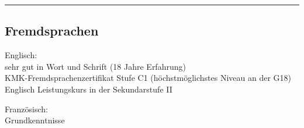 \documentclass[11pt,a4paper]{article}
\newenvironment{indentsection}[1]%
{\begin{list}{}%
	{\setlength{\leftmargin}{#1}}%
	\item[]%
}
{\end{list}}
\begin{document}
\hrule
\vspace{-0.4em}
\subsection*{Fremdsprachen}

\begin{indentsection}{\parindent}
	\begin{description*}
		\item[Englisch:] ~\\ sehr gut in Wort und Schrift (18 Jahre Erfahrung) \\ KMK-Fremdsprachenzertifikat Stufe C1 (höchstmöglichstes Niveau an der G18) \\ Englisch Leistungskurs in der Sekundarstufe II
		\item[Französisch:] ~\\ Grundkenntnisse
	\end{description*}
\end{indentsection}
\end{document}
